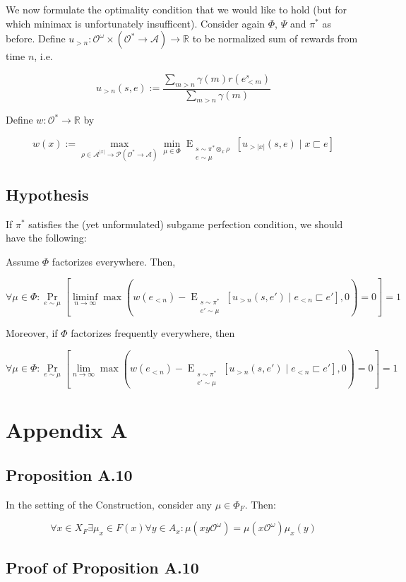 \documentclass[a4paper]{article}
\DeclareMathOperator{\Prb}{Pr}
\newcommand{\EE}[2]{\operatorname{E}_{\substack{#1 \\ #2}}}
\newcommand{\Reals}{\mathbb{R}}
\newcommand{\Abs}[1]{\lvert #1 \rvert}
\newcommand{\Prob}{\mathcal{P}}
\newcommand{\Act}{\mathcal{A}}
\newcommand{\Obs}{\mathcal{O}}
\newcommand{\ObsO}{\Obs^\omega}
\newcommand{\Pol}{\Obs^* \rightarrow \Act}
\begin{document}
We now formulate the optimality condition that we would like to hold (but for which minimax is unfortunately insufficent). Consider again ${\Phi}$, ${\Psi}$ and ${\pi^*}$ as before. Define ${u_{> n}: \ObsO \times (\Pol) \rightarrow \Reals}$ to be normalized sum of rewards from time ${n}$, i.e.

$$u_{> n}(s,e):=\frac{\sum_{m > n} \gamma(m)r(e^s_{<m})}{\sum_{m > n} \gamma(m)}$$

Define ${w: \Obs^* \rightarrow \Reals}$ by

$$w(x):=\max_{\rho \in \Act^{\Abs{x}} \rightarrow \Prob(\Pol)} \min_{\mu \in \Phi} \EE{s \sim \pi^* \otimes_x \rho}{e \sim \mu}[u_{> \Abs{x}}(s,e) \mid x \sqsubset e]$$

\subsection{Hypothesis}

If ${\pi^*}$ satisfies the (yet unformulated) subgame perfection condition, we should have the following:

Assume ${\Phi}$ factorizes everywhere. Then,

$$\forall \mu \in \Phi: \Prb_{e \sim \mu}[\liminf_{n \rightarrow \infty} \max(w(e_{<n})-\EE{s \sim \pi^*}{e' \sim \mu}[u_{> n}(s,e') \mid e_{<n} \sqsubset e'] ,0)=0] = 1$$

Moreover, if ${\Phi}$ factorizes frequently everywhere, then

$$\forall \mu \in \Phi: \Prb_{e \sim \mu}[\lim_{n \rightarrow \infty} \max(w(e_{<n})-\EE{s \sim \pi^*}{e' \sim \mu}[u_{> n}(s,e') \mid e_{<n} \sqsubset e'] ,0)=0] = 1$$

\section{Appendix A}

\subsection{Proposition A.10}

In the setting of the Construction, consider any ${\mu \in \Phi_F}$. Then:

$$\forall x \in X_F \exists \mu_x \in F(x) \forall y \in A_x: \mu(xy\ObsO) = \mu(x\ObsO) \mu_x(y)$$

\subsection{Proof of Proposition A.10}
\end{document}
